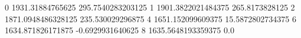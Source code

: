 0 1931.31884765625 295.7540283203125
1 1901.3822021484375 265.8173828125
2 1871.0948486328125 235.530029296875
4 1651.152099609375 15.5872802734375
6 1634.871826171875 -0.6929931640625
8 1635.5648193359375 0.0
